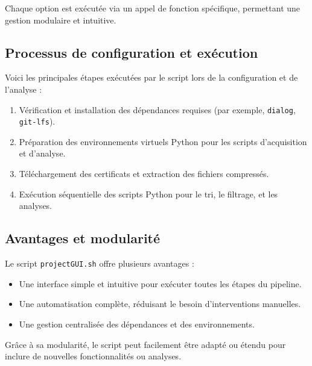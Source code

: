 \documentclass[11pt,a4paper]{article}
\begin{document}
Chaque option est exécutée via un appel de fonction spécifique, permettant une gestion modulaire et intuitive.

\subsection{Processus de configuration et exécution}
Voici les principales étapes exécutées par le script lors de la configuration et de l'analyse :
\begin{enumerate}
    \item Vérification et installation des dépendances requises (par exemple, \texttt{dialog}, \texttt{git-lfs}).
    \item Préparation des environnements virtuels Python pour les scripts d'acquisition et d'analyse.
    \item Téléchargement des certificats et extraction des fichiers compressés.
    \item Exécution séquentielle des scripts Python pour le tri, le filtrage, et les analyses.
\end{enumerate}

\subsection{Avantages et modularité}
Le script \texttt{projectGUI.sh} offre plusieurs avantages :
\begin{itemize}
    \item Une interface simple et intuitive pour exécuter toutes les étapes du pipeline.
    \item Une automatisation complète, réduisant le besoin d'interventions manuelles.
    \item Une gestion centralisée des dépendances et des environnements.
\end{itemize}

Grâce à sa modularité, le script peut facilement être adapté ou étendu pour inclure de nouvelles fonctionnalités ou analyses.
\end{document}
